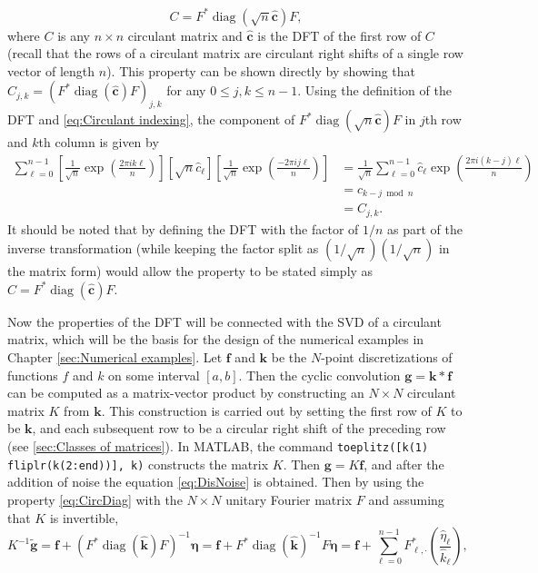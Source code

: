 \documentclass[12pt]{book}
\newcommand{\gVec}{\mathbf{g}}	%
\newcommand{\gnoiseVec}{\widetilde{\mathbf{g}}}	%
\newcommand{\kVec}{\mathbf{k}}	%
\newcommand{\kMat}{K}	%
\newcommand{\fVec}{\mathbf{f}}	%
\newcommand{\ctrans}{*}	%
\DeclareMathOperator{\diag}{diag}	%
\newcommand{\noise}{\eta}	%
\newcommand{\noiseVec}{\bm{\noise}}	%
\begin{document}
\begin{equation}
C = F^\ctrans\diag(\sqrt{n}\widehat{\mathbf{c}})F,
\label{eq:CircDiag}
\end{equation}
where $C$ is any $n \times n$ circulant matrix and $\widehat{\mathbf{c}}$ is the DFT of the first row of $C$ (recall that the rows of a circulant matrix are circulant right shifts of a single row vector of length $n$). This property can be shown directly by showing that $C_{j,k} = (F^\ctrans\diag(\widehat{\mathbf{c}})F)_{j,k}$ for any $0 \leq j,k \leq n-1$. Using the definition of the DFT and \eqref{eq:Circulant indexing}, the component of $F^\ctrans\diag(\sqrt{n}\widehat{\mathbf{c}})F$ in $j$th row and $k$th column is given by
\begin{align*}
\sum_{\ell=0}^{n-1} \left[\frac{1}{\sqrt{n}}  \exp\left(\frac{2\pi{i}k\ell}{n}\right)\right] \left[\sqrt{n}\widehat{c}_\ell\right] \left[\frac{1}{\sqrt{n}} \exp\left(\frac{-2\pi{i}j\ell}{n}\right)\right] &= \frac{1}{\sqrt{n}} \sum_{\ell=0}^{n-1} \widehat{c}_\ell \exp\left(\frac{2\pi{i}(k-j)\ell}{n}\right) \\
&= c_{k-j \bmod n} \\
&= C_{j,k}.
\end{align*}
It should be noted that by defining the DFT with the factor of $1/n$ as part of the inverse transformation (while keeping the factor split as $(1/\sqrt{n})(1/\sqrt{n})$ in the matrix form) would allow the property to be stated simply as $C = F^\ctrans\diag(\widehat{\mathbf{c}})F$. \par 
Now the properties of the DFT will be connected with the SVD of a circulant matrix, which will be the basis for the design of the numerical examples in Chapter \ref{sec:Numerical examples}. Let $\fVec$ and $\kVec$ be the $N$-point discretizations of functions $f$ and $k$ on some interval $[a,b]$. Then the cyclic convolution $\gVec = \kVec * \fVec$ can be computed as a matrix-vector product by constructing an $N \times N$ circulant matrix $\kMat$ from $\kVec$. This construction is carried out by setting the first row of $\kMat$ to be $\kVec$, and each subsequent row to be a circular right shift of the preceding row (see \ref{sec:Classes of matrices}). In MATLAB, the command \texttt{toeplitz([k(1) fliplr(k(2:end))], k)} constructs the matrix $\kMat$. Then $\gVec = \kMat\fVec$, and after the addition of noise the equation \eqref{eq:DisNoise} is obtained. Then by using the property \eqref{eq:CircDiag} with the $N \times N$ unitary Fourier matrix $F$ and assuming that $\kMat$ is invertible, 
\begin{equation}
\kMat^{-1}\gnoiseVec = \fVec + (F^\ctrans\diag(\widehat{\kVec})F)^{-1}\noiseVec = \fVec + F^\ctrans\diag(\widehat{\kVec})^{-1}F\noiseVec = \fVec + \sum_{\ell = 0}^{n-1} F^\ctrans_{\ell,\cdot}\left(\frac{\widehat{\noise}_\ell}{\widehat{k}_\ell}\right),
\label{eq:InvProdDFT}
\end{equation}
\end{document}
